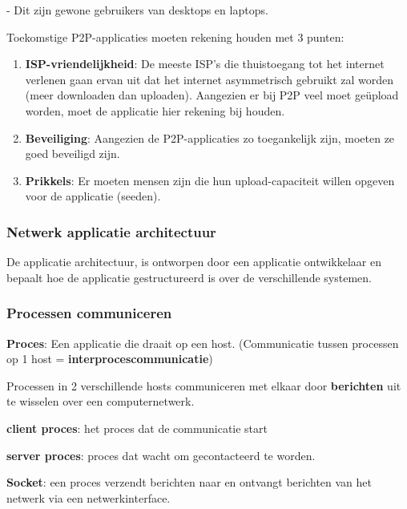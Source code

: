 \noindent - Dit zijn gewone gebruikers van desktops en laptops.

\noindent Toekomstige P2P-applicaties moeten rekening houden met 3 punten:
\begin{enumerate}
\item \textbf{ISP-vriendelijkheid}: De meeste ISP’s die thuistoegang tot het internet verlenen gaan ervan uit dat het internet asymmetrisch gebruikt zal worden (meer downloaden dan uploaden). Aangezien er bij P2P veel moet geüpload worden, moet de applicatie hier rekening bij houden.
\item \textbf{Beveiliging}: Aangezien de P2P-applicaties zo toegankelijk zijn, moeten ze goed beveiligd zijn.
\item \textbf{Prikkels}: Er moeten mensen zijn die hun upload-capaciteit willen opgeven voor de applicatie (seeden).
\end{enumerate}

\subsubsection{Netwerk applicatie architectuur}

\noindent De applicatie architectuur, is ontworpen door een applicatie ontwikkelaar en bepaalt hoe de applicatie gestructureerd is over de verschillende systemen.

\newpage

\subsubsection{Processen communiceren}

\noindent \textbf{Proces}: Een applicatie die draait op een host. (Communicatie tussen processen op 1 host = \textbf{interprocescommunicatie})

\noindent Processen in 2 verschillende hosts communiceren met elkaar door \textbf{berichten} uit te wisselen over een computernetwerk.


\textbf{client proces}: het proces dat de communicatie start

\noindent \textbf{server proces}: proces dat wacht om gecontacteerd te worden.


\noindent \textbf{Socket}: een proces verzendt berichten naar en ontvangt berichten van het netwerk via een netwerkinterface.

